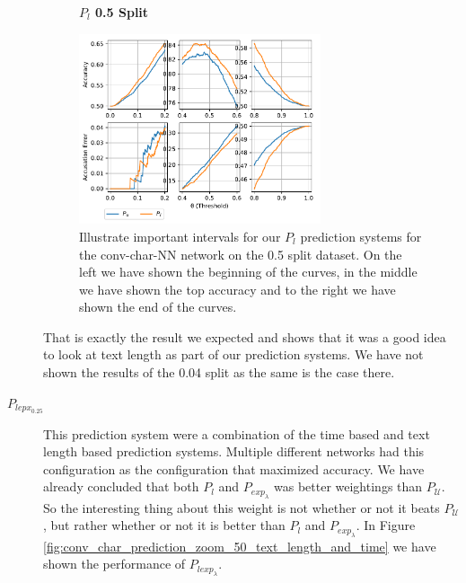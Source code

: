 \begin{description}
        \begin{figure}
            \centering
            \textbf{$P_l$ 0.5 Split}\par\medskip
            \includegraphics[width=0.7\textwidth]{./pictures/discussion/conv_char_nn_prediction_zoom_50_text_length}
            \caption{Illustrate important intervals for our $P_l$ prediction
                systems for the \gls{conv-char-NN} network on the 0.5 split
                dataset. On the left we have shown the beginning of the curves,
                in the middle we have shown the top accuracy and to the right we
                have shown the end of the curves.}
            \label{fig:conv_char_prediction_zoom_50_text_length}
        \end{figure}

        That is exactly the result we expected and shows that it was a good idea
        to look at text length as part of our prediction systems. We have not
        shown the results of the 0.04 split as the same is the case there.

    \item[$P_{lepx_{0.25}}$]

        This prediction system were a combination of the time based and text
        length based prediction systems. Multiple different networks had this
        configuration as the configuration that maximized accuracy. We have
        already concluded that both $P_l$ and $P_{exp_\lambda}$ was better
        weightings than $P_\mathcal{U}$. So the interesting thing about this
        weight is not whether or not it beats $P_\mathcal{U}$, but rather
        whether or not it is better than $P_l$ and $P_{exp_\lambda}$. In Figure
        \ref{fig:conv_char_prediction_zoom_50_text_length_and_time} we have
        shown the performance of $P_{lexp_\lambda}$.


\end{description}
